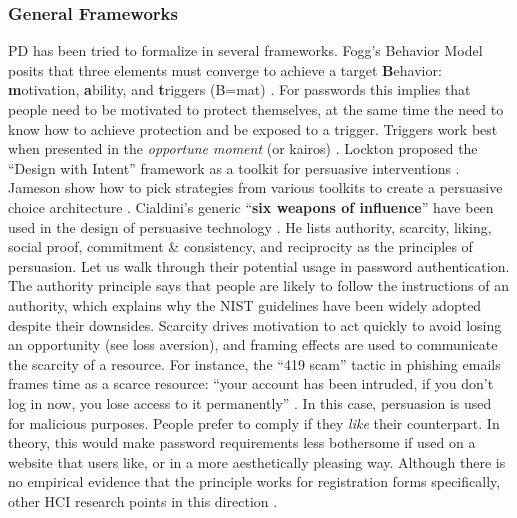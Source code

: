 	\subsubsection{General Frameworks}
	\gls{PD} has been tried to formalize in several frameworks. Fogg's Behavior Model posits that three elements must converge to achieve a target \textbf{B}ehavior: \textbf{m}otivation, \textbf{a}bility, and \textbf{t}riggers (B=mat) \cite{Fogg2009BehavioralModel}. For passwords this implies that people need to be motivated to protect themselves, at the same time the need to know how to achieve protection and be exposed to a trigger. Triggers work best when presented in the \textit{opportune moment} (or kairos) \cite{Lockton2010DesignWithIntent}.  %
	Lockton \etal proposed the ``Design with Intent'' framework as a toolkit for persuasive interventions \cite{Lockton2010DesignWithIntent}. Jameson \etal show how to pick strategies from various toolkits to create a persuasive choice architecture \cite{Jameson2011PreferentialChoice}. 
	Cialdini's generic ``\textbf{six weapons of influence}'' have been used in the design of persuasive technology \cite{Cialdini2007Influence}. He lists authority, scarcity, liking, social proof, commitment \& consistency, and reciprocity as the principles of persuasion. Let us walk through their potential usage in password authentication. 
	The authority principle says that people are likely to follow the instructions of an authority, which explains why the \gls{NIST} guidelines have been widely adopted despite their downsides. 
	Scarcity drives motivation to act quickly to avoid losing an opportunity (see loss aversion), and framing effects are used to communicate the scarcity of a resource. For instance, the ``419 scam'' tactic in phishing emails frames time as a scarce resource: ``your account has been intruded, if you don't log in now, you lose access to it permanently'' \cite{Stajano2011Principles}. In this case, persuasion is used for malicious purposes. 
	People prefer to comply if they \textit{like} their counterpart. In theory, this would make password requirements less bothersome if used on a website that users like, or in a more aesthetically pleasing way. Although there is no empirical evidence that the principle works for registration forms specifically, other HCI research points in this direction \cite{Tractinsky2000WhatIsBeautiful, Fogg2001WhatMakesSitesCredible}. %
